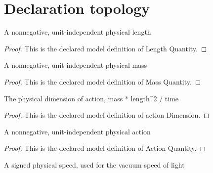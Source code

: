 \section{Declaration topology}
\begin{definition}
  \label{def:physics:phyx-mini-0659:phyxminiproblems-problemphyxmini0659-lengthquantity}
  A nonnegative, unit-independent physical length
\end{definition}
\begin{proof}
  This is the declared model definition of Length Quantity.
\end{proof}
\begin{definition}
  \label{def:physics:phyx-mini-0659:phyxminiproblems-problemphyxmini0659-massquantity}
  A nonnegative, unit-independent physical mass
\end{definition}
\begin{proof}
  This is the declared model definition of Mass Quantity.
\end{proof}
\begin{definition}
  \label{def:physics:phyx-mini-0659:phyxminiproblems-problemphyxmini0659-actiondimension}
  The physical dimension of action, mass * length\textasciicircum{}2 / time
\end{definition}
\begin{proof}
  This is the declared model definition of action Dimension.
\end{proof}
\begin{definition}
  \label{def:physics:phyx-mini-0659:phyxminiproblems-problemphyxmini0659-actionquantity}
  A nonnegative, unit-independent physical action
\end{definition}
\begin{proof}
  This is the declared model definition of Action Quantity.
\end{proof}
\begin{definition}
  \label{def:physics:phyx-mini-0659:phyxminiproblems-problemphyxmini0659-lightspeedquantity}
  A signed physical speed, used for the vacuum speed of light
\end{definition}
